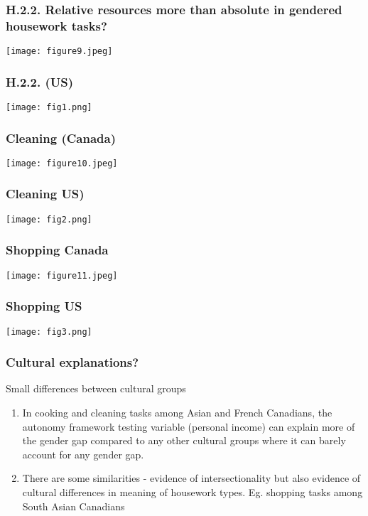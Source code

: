 \documentclass{beamer}
\begin{document}
\begin{frame}
\frametitle{H.2.2. Relative resources more than absolute in gendered housework tasks?}
  \texttt{[image: figure9.jpeg]}
\end{frame}

\begin{frame}
\frametitle{H.2.2. (US)}
  \texttt{[image: fig1.png]}
\end{frame}

\begin{frame}
\frametitle{Cleaning (Canada)}
  \texttt{[image: figure10.jpeg]}
\end{frame}

\begin{frame}
\frametitle{Cleaning US)}
  \texttt{[image: fig2.png]}
\end{frame}

\begin{frame}
\frametitle{Shopping Canada}
  \texttt{[image: figure11.jpeg]}
\end{frame}

\begin{frame}
\frametitle{Shopping US}
  \texttt{[image: fig3.png]}
\end{frame}

\begin{frame}
\frametitle{Cultural explanations?}

Small differences between cultural groups

  \begin{enumerate}
  \item  In cooking and cleaning tasks among Asian and French Canadians, the autonomy framework testing variable (personal income) can explain more of the gender gap compared to any other cultural groups where it can barely account for any gender gap.
  \item There are some similarities - evidence of intersectionality but also evidence of cultural differences in meaning of housework types. Eg. shopping tasks among South Asian Canadians  
  \end{enumerate}
\end{frame}
\end{document}
